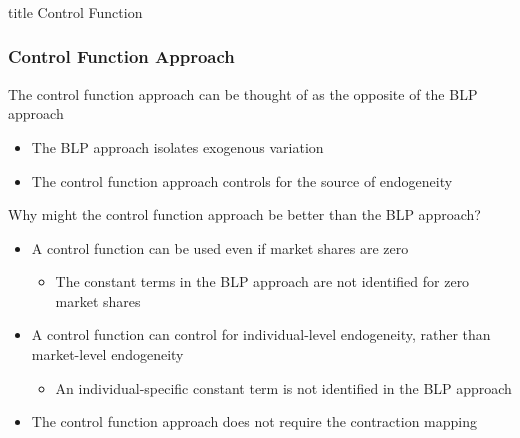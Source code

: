 \documentclass{beamer}
\begin{document}
\begin{frame}\frametitle{}
    \vfill
    \centering
    \begin{beamercolorbox}[center]{title}
        \Large Control Function
    \end{beamercolorbox}
    \vfill
\end{frame}

\begin{frame}\frametitle{Control Function Approach}
    The control function approach can be thought of as the opposite of the BLP approach
    \begin{itemize}
        \item The BLP approach isolates exogenous variation
        \item The control function approach controls for the source of endogeneity
    \end{itemize}
    \vspace{2ex}
    Why might the control function approach be better than the BLP approach?
    \begin{itemize}
        \item A control function can be used even if market shares are zero
        \begin{itemize}
            \item The constant terms in the BLP approach are not identified for zero market shares
        \end{itemize}
        \item A control function can control for individual-level endogeneity, rather than market-level endogeneity
        \begin{itemize}
            \item An individual-specific constant term is not identified in the BLP approach
        \end{itemize}
        \item The control function approach does not require the contraction mapping
    \end{itemize}
\end{frame}
\end{document}

